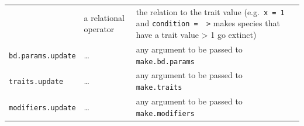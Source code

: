 \documentclass[
]{book}
\begin{document}
\begin{longtable}[]{@{}llll@{}}
\begin{minipage}[t]{0.23\columnwidth}
\end{minipage} & \begin{minipage}[t]{0.14\columnwidth}\raggedright
a relational operator\strut
\end{minipage} & \begin{minipage}[t]{0.33\columnwidth}\raggedright
the relation to the trait value (e.g.~\texttt{x\ =\ 1} and \texttt{condition\ =\ \ \textgreater{}} makes species that have a trait value \textgreater{} 1 go extinct)\strut
\end{minipage}\tabularnewline
\begin{minipage}[t]{0.19\columnwidth}\raggedright
\texttt{bd.params.update}\strut
\end{minipage} & \begin{minipage}[t]{0.23\columnwidth}\raggedright
\ldots{}\strut
\end{minipage} & \begin{minipage}[t]{0.14\columnwidth}\raggedright
any argument to be passed to \texttt{make.bd.params}\strut
\end{minipage} & \begin{minipage}[t]{0.33\columnwidth}\raggedright
\strut
\end{minipage}\tabularnewline
\begin{minipage}[t]{0.19\columnwidth}\raggedright
\texttt{traits.update}\strut
\end{minipage} & \begin{minipage}[t]{0.23\columnwidth}\raggedright
\ldots{}\strut
\end{minipage} & \begin{minipage}[t]{0.14\columnwidth}\raggedright
any argument to be passed to \texttt{make.traits}\strut
\end{minipage} & \begin{minipage}[t]{0.33\columnwidth}\raggedright
\strut
\end{minipage}\tabularnewline
\begin{minipage}[t]{0.19\columnwidth}\raggedright
\texttt{modifiers.update}\strut
\end{minipage} & \begin{minipage}[t]{0.23\columnwidth}\raggedright
\ldots{}\strut
\end{minipage} & \begin{minipage}[t]{0.14\columnwidth}\raggedright
any argument to be passed to \texttt{make.modifiers}\strut
\end{minipage} & \begin{minipage}[t]{0.33\columnwidth}\raggedright
\strut
\end{minipage}\tabularnewline
\bottomrule
\end{longtable}
\end{document}
